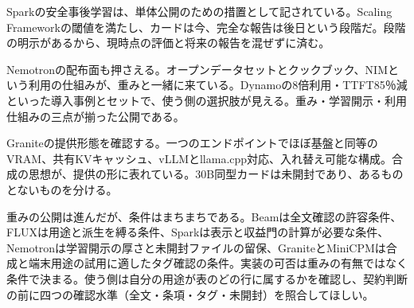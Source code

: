 \documentclass[lualatex,a4paper,10pt]{jlreq}
\begin{document}
Sparkの安全事後学習は、単体公開のための措置として記されている。Scaling Frameworkの閾値を満たし、カードは今、完全な報告は後日という段階だ。段階の明示があるから、現時点の評価と将来の報告を混ぜずに済む。
\cite{B13,B14,B15}


Nemotronの配布面も押さえる。オープンデータセットとクックブック、NIMという利用の仕組みが、重みと一緒に来ている。Dynamoの8倍利用・TTFT85％減といった導入事例とセットで、使う側の選択肢が見える。重み・学習開示・利用仕組みの三点が揃った公開である。
\cite{B20,B21,B22}


Graniteの提供形態を確認する。一つのエンドポイントでほぼ基盤と同等のVRAM、共有KVキャッシュ、vLLMとllama.cpp対応、入れ替え可能な構成。合成の思想が、提供の形に表れている。30B同型カードは未開封であり、あるものとないものを分ける。
\cite{B23,B24,B25}


重みの公開は進んだが、条件はまちまちである。Beamは全文確認の許容条件、FLUXは用途と派生を縛る条件、Sparkは表示と収益門の計算が必要な条件、Nemotronは学習開示の厚さと未開封ファイルの留保、GraniteとMiniCPMは合成と端末用途の試用に適したタグ確認の条件。実装の可否は重みの有無ではなく条件で決まる。使う側は自分の用途が表のどの行に属するかを確認し、契約判断の前に四つの確認水準（全文・条項・タグ・未開封）を照合してほしい。
\cite{B20,B21,B28,B23,B26,B29,B30,B24,B25,B13,B27,B16,B17,B18,B19,B14,B22,B15}
\end{document}
